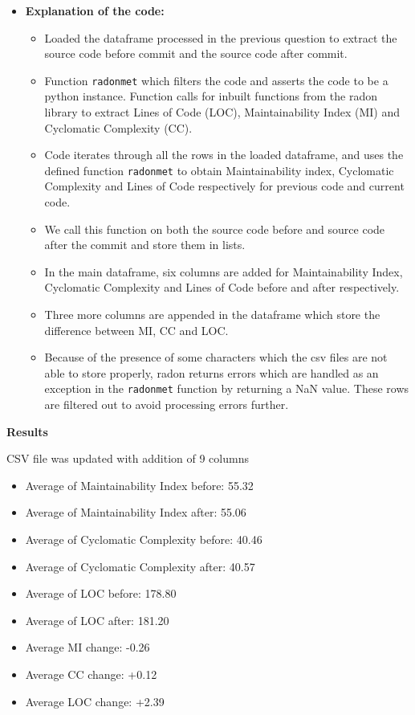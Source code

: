 \documentclass[12pt, a4paper]{report}
\newcommand{\sectionbar}[1]{%
  \vspace{0.6\baselineskip}%
  \noindent
  \colorbox{sectionbar}{%
    \parbox{\dimexpr\linewidth-2\fboxsep\relax}{%
      \textbf{\Large\textsf{#1}}%
    }%
  }%
  \vspace{0.6\baselineskip}
}
\begin{document}
\begin{itemize}
        \newpage
        \begin{itemize}
            \item \textbf{Explanation of the code:}
            \begin{itemize}
                \item Loaded the dataframe processed in the previous question to extract the source code before commit and the source code after commit.
                \item Function \texttt{radonmet} which filters the code and asserts the code to be a python instance. Function calls for inbuilt functions from the radon library to extract Lines of Code (LOC), Maintainability Index (MI) and Cyclomatic Complexity (CC).
                \item Code iterates through all the rows in the loaded dataframe, and uses the defined function \texttt{radonmet} to obtain Maintainability index, Cyclomatic Complexity and Lines of Code respectively for previous code and current code.
                \item We call this function on both the source code before and source code after the commit and store them in lists.
                \item In the main dataframe, six columns are added for Maintainability Index, Cyclomatic Complexity and Lines of Code before and after respectively.
                \item Three more columns are appended in the dataframe which store the difference between MI, CC and LOC.
                \item Because of the presence of some characters which the csv files are not able to store properly, radon returns errors which are handled as an exception in the \texttt{radonmet} function by returning a NaN value. These rows are filtered out to avoid processing errors further.
            \end{itemize}
        \end{itemize}
    \end{itemize}

\sectionbar{Results}
CSV file was updated with addition of 9 columns
\begin{itemize}
    \item Average of Maintainability Index before: 55.32
    \item Average of Maintainability Index after: 55.06
    \item Average of Cyclomatic Complexity before: 40.46
    \item Average of Cyclomatic Complexity after: 40.57
    \item Average of LOC before: 178.80
    \item Average of LOC after: 181.20
    \item Average MI change: -0.26
    \item Average CC change: +0.12
    \item Average LOC change: +2.39
\end{itemize}
\end{document}
